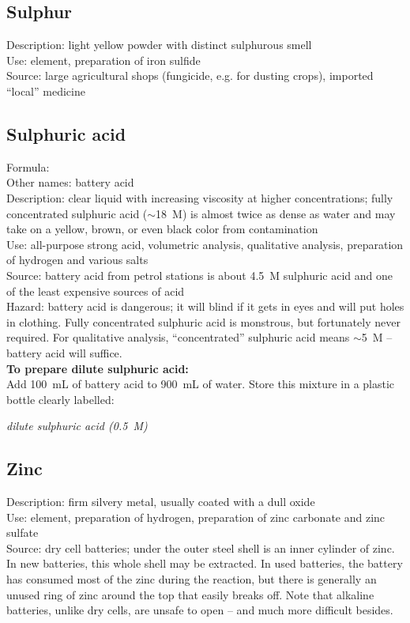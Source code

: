 \subsection*{Sulphur}
Description: light yellow powder with distinct sulphurous smell\\
Use: element, 
preparation of iron sulfide\\
Source: large agricultural shops (fungicide, 
e.g. 
for dusting crops), 
imported ``local'' medicine
\subsection*{Sulphuric acid}
Formula: \\
Other names: battery acid\\
Description: clear liquid with increasing viscosity at higher concentrations; 
fully concentrated sulphuric acid ($\sim$18~M) is almost twice as dense as water 
and may take on a yellow, 
brown, 
or even black color from contamination\\
Use: all-purpose strong acid, 
volumetric analysis, 
qualitative analysis, 
preparation of hydrogen and various salts\\
Source: battery acid from petrol stations 
is about 4.5~M sulphuric acid and one of the least expensive sources of acid\\
Hazard: battery acid is dangerous; 
it will blind if it gets in eyes and will put holes in clothing. 
Fully concentrated sulphuric acid is monstrous, 
but fortunately never required. 
For qualitative analysis, 
``concentrated'' sulphuric acid means $\sim$5~M -- battery acid will suffice.\\
\textbf{To prepare dilute sulphuric acid:}\\
Add 100~mL of battery acid to 900~mL of water. 
Store this mixture in a plastic bottle clearly labelled:
\begin{center}
\textit{dilute sulphuric acid (0.5~M)}
\end{center}
\subsection*{Zinc}
\label{sec:zinc}
Description: firm silvery metal, 
usually coated with a dull oxide\\
Use: element, 
preparation of hydrogen, 
preparation of zinc carbonate and zinc sulfate\\
Source: dry cell batteries; 
under the outer steel shell is an inner cylinder of zinc. 
In new batteries, 
this whole shell may be extracted. 
In used batteries, 
the battery has consumed most of the zinc during the reaction, 
but there is generally an unused ring of zinc around the top 
that easily breaks off. 
Note that alkaline batteries, 
unlike dry cells, 
are unsafe to open -- and much more difficult besides.
